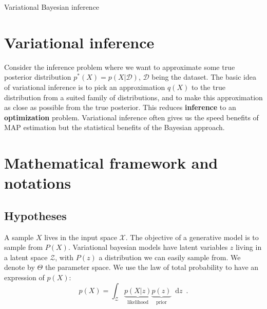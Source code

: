 \documentclass[12pt]{article}
\newcommand*\diff{\mathop{}\!\mathrm{d}}
\begin{document}
\begin{center}
    \LARGE
    Variational Bayesian inference
\end{center}


\section{Variational inference}

Consider the inference problem where we want to approximate some true posterior distribution $p^*(X) = p(X \vert \mathcal{D})$, $\mathcal{D}$ being the dataset.
The basic idea of variational inference is to pick an approximation $q(X)$ to the true distribution from a suited family of distributions, and to make this approximation as close as possible from the true posterior.
This reduces \textbf{inference} to an \textbf{optimization} problem.
Variational inference often gives us the speed benefits of MAP estimation but the statistical benefits of the Bayesian approach.

\section{Mathematical framework and notations}

\subsection{Hypotheses}

A sample $X$ lives in the input space $\mathcal{X}$.
The objective of a generative model is to sample from $P(X)$.
Variational bayesian models have latent variables $z$ living in a latent space $\mathcal{Z}$, with $P(z)$ a distribution we can easily sample from.
We denote by $\Theta$ the parameter space.
%
%
%
We use the law of total probability to have an expression of $p(X)$:
%
\begin{equation}
    \label{eq:law_tot_proba}
    p(X) = \int_{\mathcal{Z}}
    \underbrace{p(X \vert z)}_{\textrm{likelihood}}
    \underbrace{p(z)}_\textrm{prior}
    \diff z
    \enspace .
\end{equation}
%
\end{document}
